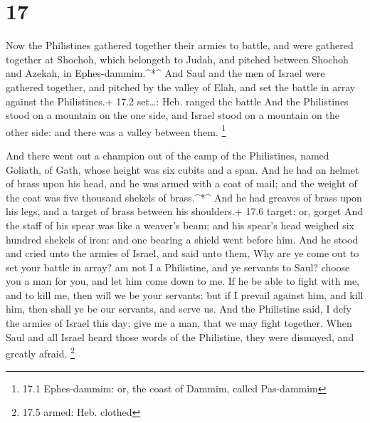 \hypertarget{section-16}{%
\section{17}\label{section-16}}

 Now the Philistines gathered together their armies to
battle, and were gathered together at Shochoh, which belongeth to Judah,
and pitched between Shochoh and Azekah, in Ephes-dammim.\^{}*\^{}
 And Saul and the men of Israel were gathered together, and
pitched by the valley of Elah, and set the battle in array against the
Philistines.+ 17.2 set\ldots: Heb. ranged the battle  And
the Philistines stood on a mountain on the one side, and Israel stood on
a mountain on the other side: and there was a valley between them.
\footnote{17.1 Ephes-dammim: or, the coast of Dammim, called Pas-dammim}

 And there went out a champion out of the camp of the
Philistines, named Goliath, of Gath, whose height was six cubits and a
span.  And he had an helmet of brass upon his head, and he
was armed with a coat of mail; and the weight of the coat was five
thousand shekels of brass.\^{}*\^{}  And he had greaves of
brass upon his legs, and a target of brass between his shoulders.+ 17.6
target: or, gorget  And the staff of his spear was like a
weaver's beam; and his spear's head weighed six hundred shekels of iron:
and one bearing a shield went before him.  And he stood and
cried unto the armies of Israel, and said unto them, Why are ye come out
to set your battle in array? am not I a Philistine, and ye servants to
Saul? choose you a man for you, and let him come down to me.
 If he be able to fight with me, and to kill me, then will
we be your servants: but if I prevail against him, and kill him, then
shall ye be our servants, and serve us.  And the Philistine
said, I defy the armies of Israel this day; give me a man, that we may
fight together.  When Saul and all Israel heard those words
of the Philistine, they were dismayed, and greatly afraid. \footnote{17.5
  armed: Heb. clothed}

